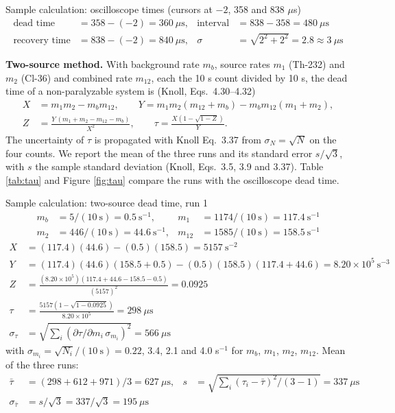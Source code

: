 \documentclass[12pt]{article}
\begin{document}
\begin{samplecalc}{Sample calculation: oscilloscope times (cursors at $-2$, 358 and 838 $\mu$s)}
\begin{align*}
\text{dead time} &= 358 - (-2) = 360\ \mu\text{s}, &
\text{interval} &= 838 - 358 = 480\ \mu\text{s}\\
\text{recovery time} &= 838 - (-2) = 840\ \mu\text{s}, &
\sigma &= \sqrt{2^2 + 2^2} = 2.8 \approx 3\ \mu\text{s}
\end{align*}
\end{samplecalc}

\textbf{Two-source method.} With background rate $m_b$, source rates $m_1$ (Th-232) and $m_2$ (Cl-36) and combined rate $m_{12}$, each the 10 s count divided by 10 s, the dead time of a non-paralyzable system is (Knoll, Eqs.\ 4.30--4.32) \cite{knoll}
\begin{align}
 X &= m_1 m_2 - m_b m_{12}, \qquad
 Y = m_1 m_2 (m_{12} + m_b) - m_b m_{12}(m_1 + m_2),\\
 Z &= \frac{Y\,(m_1 + m_2 - m_{12} - m_b)}{X^2}, \qquad
 \tau = \frac{X\left(1 - \sqrt{1 - Z}\right)}{Y}.
\end{align}
The uncertainty of $\tau$ is propagated with Knoll Eq.\ 3.37 from $\sigma_N = \sqrt{N}$ on the four counts. We report the mean of the three runs and its standard error $s/\sqrt{3}$, with $s$ the sample standard deviation (Knoll, Eqs.\ 3.5, 3.9 and 3.37). Table \ref{tab:tau} and Figure \ref{fig:tau} compare the runs with the oscilloscope dead time.

\begin{samplecalc}{Sample calculation: two-source dead time, run 1}
\begin{align*}
m_b &= 5/(10\ \text{s}) = 0.5\ \text{s}^{-1}, & m_1 &= 1174/(10\ \text{s}) = 117.4\ \text{s}^{-1}\\
m_2 &= 446/(10\ \text{s}) = 44.6\ \text{s}^{-1}, & m_{12} &= 1585/(10\ \text{s}) = 158.5\ \text{s}^{-1}
\end{align*}
\begin{align*}
X &= (117.4)(44.6) - (0.5)(158.5) = 5157\ \text{s}^{-2}\\
Y &= (117.4)(44.6)(158.5 + 0.5) - (0.5)(158.5)(117.4 + 44.6) = 8.20\times10^{5}\ \text{s}^{-3}\\
Z &= \frac{(8.20\times10^{5})(117.4 + 44.6 - 158.5 - 0.5)}{(5157)^2} = 0.0925\\
\tau &= \frac{5157\left(1 - \sqrt{1 - 0.0925}\right)}{8.20\times10^{5}} = 298\ \mu\text{s}\\
\sigma_\tau &= \sqrt{\textstyle\sum_i (\partial\tau/\partial m_i\,\sigma_{m_i})^2} = 566\ \mu\text{s}
\end{align*}
with $\sigma_{m_i} = \sqrt{N_i}/(10\ \text{s}) = 0.22$, 3.4, 2.1 and 4.0 s$^{-1}$ for $m_b$, $m_1$, $m_2$, $m_{12}$. Mean of the three runs:
\begin{align*}
\bar\tau &= (298 + 612 + 971)/3 = 627\ \mu\text{s}, &
s &= \sqrt{\textstyle\sum_i (\tau_i - \bar\tau)^2/(3 - 1)} = 337\ \mu\text{s}\\
\sigma_{\bar\tau} &= s/\sqrt{3} = 337/\sqrt{3} = 195\ \mu\text{s}
\end{align*}
\end{samplecalc}
\end{document}
